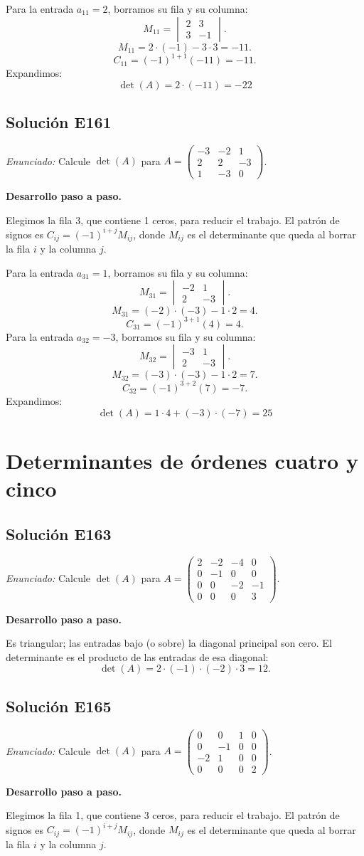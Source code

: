 \documentclass[12pt]{article}
\theoremstyle{remark}
\newcommand{\solucion}[2]{\Needspace{11\baselineskip}\subsection*{Solución E#1}\noindent\textit{Enunciado:} #2\par\medskip\noindent\textbf{Desarrollo paso a paso.}\par\medskip}
\begin{document}
Para la entrada $a_{11}=2$, borramos su fila y su columna:
\[
M_{11}=\begin{vmatrix}2&3\\3&-1\end{vmatrix}.
\]
\[
M_{11}=2\cdot (-1)-3\cdot 3=-11.
\]
\[
C_{11}=(-1)^{1+1}(-11)=-11.
\]
Expandimos: \[
\boxed{\det(A)=2\cdot (-11)=-22}
\]

\medskip

\solucion{161}{Calcule $\det(A)$ para $A=\begin{pmatrix}-3&-2&1\\2&2&-3\\1&-3&0\end{pmatrix}$.}
Elegimos la fila 3, que contiene 1 ceros, para reducir el trabajo. El patrón de signos es $C_{ij}=(-1)^{i+j}M_{ij}$, donde $M_{ij}$ es el determinante que queda al borrar la fila $i$ y la columna $j$.

Para la entrada $a_{31}=1$, borramos su fila y su columna:
\[
M_{31}=\begin{vmatrix}-2&1\\2&-3\end{vmatrix}.
\]
\[
M_{31}=(-2)\cdot (-3)-1\cdot 2=4.
\]
\[
C_{31}=(-1)^{3+1}(4)=4.
\]
Para la entrada $a_{32}=-3$, borramos su fila y su columna:
\[
M_{32}=\begin{vmatrix}-3&1\\2&-3\end{vmatrix}.
\]
\[
M_{32}=(-3)\cdot (-3)-1\cdot 2=7.
\]
\[
C_{32}=(-1)^{3+2}(7)=-7.
\]
Expandimos: \[
\boxed{\det(A)=1\cdot 4 + (-3)\cdot (-7)=25}
\]

\medskip

\section{Determinantes de órdenes cuatro y cinco}

\solucion{163}{Calcule $\det(A)$ para $A=\begin{pmatrix}2&-2&-4&0\\0&-1&0&0\\0&0&-2&-1\\0&0&0&3\end{pmatrix}$.}
Es triangular; las entradas bajo (o sobre) la diagonal principal son cero. El determinante es el producto de las entradas de esa diagonal:
\[
\det(A)=2\cdot (-1)\cdot (-2)\cdot 3=12.
\]

\medskip

\solucion{165}{Calcule $\det(A)$ para $A=\begin{pmatrix}0&0&1&0\\0&-1&0&0\\-2&1&0&0\\0&0&0&2\end{pmatrix}$.}
Elegimos la fila 1, que contiene 3 ceros, para reducir el trabajo. El patrón de signos es $C_{ij}=(-1)^{i+j}M_{ij}$, donde $M_{ij}$ es el determinante que queda al borrar la fila $i$ y la columna $j$.
\end{document}

